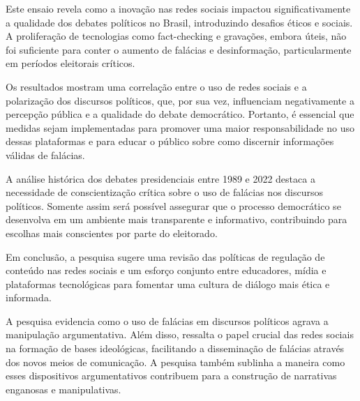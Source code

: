\documentclass[12pt]{article}
\begin{document}
Este ensaio revela como a inovação nas redes sociais impactou significativamente a qualidade dos debates políticos no Brasil, introduzindo desafios éticos e sociais. A proliferação de tecnologias como fact-checking e gravações, embora úteis, não foi suficiente para conter o aumento de falácias e desinformação, particularmente em períodos eleitorais críticos.

Os resultados mostram uma correlação entre o uso de redes sociais e a polarização dos discursos políticos, que, por sua vez, influenciam negativamente a percepção pública e a qualidade do debate democrático. Portanto, é essencial que medidas sejam implementadas para promover uma maior responsabilidade no uso dessas plataformas e para educar o público sobre como discernir informações válidas de falácias.

A análise histórica dos debates presidenciais entre 1989 e 2022 destaca a necessidade de conscientização crítica sobre o uso de falácias nos discursos políticos. Somente assim será possível assegurar que o processo democrático se desenvolva em um ambiente mais transparente e informativo, contribuindo para escolhas mais conscientes por parte do eleitorado.

Em conclusão, a pesquisa sugere uma revisão das políticas de regulação de conteúdo nas redes sociais e um esforço conjunto entre educadores, mídia e plataformas tecnológicas para fomentar uma cultura de diálogo mais ética e informada.

A pesquisa evidencia como o uso de falácias em discursos políticos agrava a manipulação argumentativa. Além disso, ressalta o papel crucial das redes sociais na formação de bases ideológicas, facilitando a disseminação de falácias através dos novos meios de comunicação. A pesquisa também sublinha a maneira como esses dispositivos argumentativos contribuem para a construção de narrativas enganosas e manipulativas.




\end{document}
